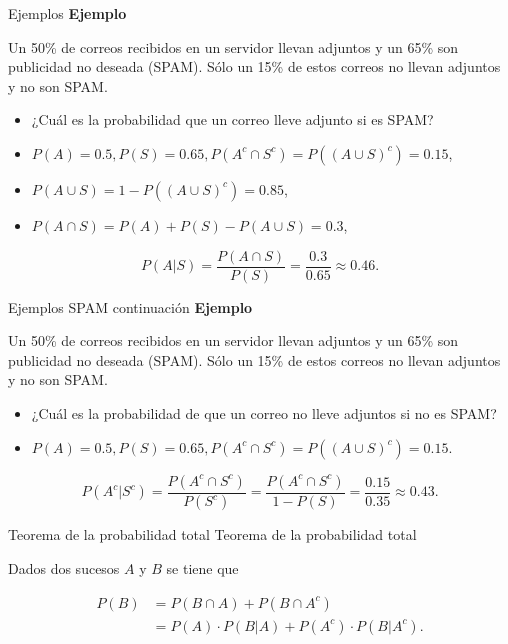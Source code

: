 \documentclass[
  ignorenonframetext,
  aspectratio=169]{beamer}
\providecommand{\tightlist}{%
  \setlength{\itemsep}{0pt}\setlength{\parskip}{0pt}}\usepackage{longtable,booktabs,array}
\begin{document}
\begin{frame}{Ejemplos}
\label{ejemplos-2}
\textbf{Ejemplo}

Un 50\% de correos recibidos en un servidor llevan adjuntos y un 65\%
son publicidad no deseada (SPAM). Sólo un 15\% de estos correos no
llevan adjuntos y no son SPAM.

\begin{itemize}
\tightlist
\item
  ¿Cuál es la probabilidad que un correo lleve adjunto si es SPAM?
\end{itemize}

\begin{itemize}
\item
  \(P(A)=0.5, P(S)=0.65, P(A^c\cap S^c)=P((A\cup S)^c)=0.15\),
\item
  \(P(A\cup S)=1-P((A\cup S)^c)=0.85\),
\item
  \(P(A\cap S)=P(A)+P(S)-P(A\cup S)=0.3\),
\end{itemize}

\[P(A|S)=\dfrac{P(A\cap S)}{P(S)}=\dfrac{0.3}{0.65}\approx 0.46.\]
\end{frame}

\begin{frame}{Ejemplos SPAM continuación}
\label{ejemplos-spam-continuaciuxf3n}
\textbf{Ejemplo}

Un 50\% de correos recibidos en un servidor llevan adjuntos y un 65\%
son publicidad no deseada (SPAM). Sólo un 15\% de estos correos no
llevan adjuntos y no son SPAM.

\begin{itemize}
\tightlist
\item
  ¿Cuál es la probabilidad de que un correo no lleve adjuntos si no es
  SPAM?
\end{itemize}

\begin{itemize}
\tightlist
\item
  \(P(A)=0.5, P(S)=0.65, P(A^c\cap S^c)=P((A\cup S)^c)=0.15.\)
\end{itemize}

\[P(A^c|S^c)=\dfrac{P(A^c\cap S^c)}{P(S^c)}=\dfrac{P(A^c\cap S^c)}{1-P(S)}=\dfrac{0.15}{0.35}\approx 0.43.\]
\end{frame}

\begin{frame}{Teorema de la probabilidad total}
\label{teorema-de-la-probabilidad-total}
Teorema de la probabilidad total

Dados dos sucesos \(A\) y \(B\) se tiene que

\[
\begin{array}{rl}
P(B)&= P(B\cap A) +P(B\cap A^c)\\
& =P(A)\cdot P(B|A)+ P(A^c)\cdot P(B|A^c).
\end{array}
\]
\end{frame}
\end{document}
